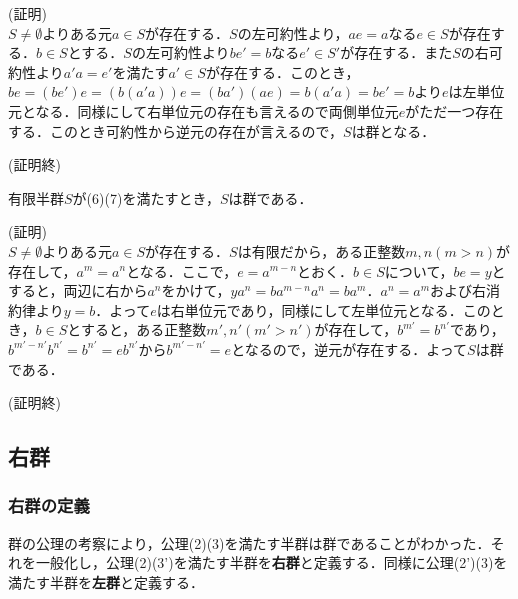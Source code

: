 \documentclass{jsarticle}
\begin{document}
(証明)\\
$S\neq\emptyset$よりある元$a\in S$が存在する．$S$の左可約性より，$ae=a$なる$e\in S$が存在する．$b\in S$とする．$S$の左可約性より$be'=b$なる$e'\in S'$が存在する．また$S$の右可約性より$a'a=e'$を満たす$a'\in S$が存在する．このとき，$be=(be')e=(b(a'a))e=(ba')(ae)=b(a'a)=be'=b$より$e$は左単位元となる．同様にして右単位元の存在も言えるので両側単位元$e$がただ一つ存在する．このとき可約性から逆元の存在が言えるので，$S$は群となる．
\begin{flushright}
(証明終)
\end{flushright}
\begin{thm}
有限半群$S$が(6)(7)を満たすとき，$S$は群である．
\end{thm}
(証明)\\
$S\neq\emptyset$よりある元$a\in S$が存在する．$S$は有限だから，ある正整数$m,n(m>n)$が存在して，$a^m=a^n$となる．ここで，$e=a^{m-n}$とおく．$b\in S$について，$be=y$とすると，両辺に右から$a^n$をかけて，$ya^n=ba^{m-n}a^n=ba^m$．$a^n=a^m$および右消約律より$y=b$．よって$e$は右単位元であり，同様にして左単位元となる．このとき，$b\in S$とすると，ある正整数$m',n'(m'>n')$が存在して，$b^{m'}=b^{n'}$であり，$b^{m'-n'}b^{n'}=b^{n'}=eb^{n'}$から$b^{m'-n'}=e$となるので，逆元が存在する．よって$S$は群である．
\begin{flushright}
(証明終)
\end{flushright}
\subsection{右群}
\subsubsection{右群の定義}
群の公理の考察により，公理(2)(3)を満たす半群は群であることがわかった．それを一般化し，公理(2)(3')を満たす半群を{\bf 右群}と定義する．同様に公理(2')(3)を満たす半群を{\bf 左群}と定義する．
\end{document}
